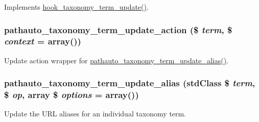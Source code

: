 \label{pathauto_8module_ab861a0bd8ac0d1116d50dc5e446e510b}
Implements \hyperlink{group__hooks_ga5c2477516245f0b9d6b04b8a8d227592}{hook\_\-taxonomy\_\-term\_\-update()}. \hypertarget{pathauto_8module_a5d96ab0723a69f47adf684f49244a47b}{
\subsubsection[{pathauto\_\-taxonomy\_\-term\_\-update\_\-action}]{\setlength{\rightskip}{0pt plus 5cm}pathauto\_\-taxonomy\_\-term\_\-update\_\-action (\$ {\em term}, \/  \$ {\em context} = {\ttfamily array()})}}
\label{pathauto_8module_a5d96ab0723a69f47adf684f49244a47b}
Update action wrapper for \hyperlink{pathauto_8module_a80bfb73e9db12fd22e6cd9908a9bca26}{pathauto\_\-taxonomy\_\-term\_\-update\_\-alias()}. \hypertarget{pathauto_8module_a80bfb73e9db12fd22e6cd9908a9bca26}{
\subsubsection[{pathauto\_\-taxonomy\_\-term\_\-update\_\-alias}]{\setlength{\rightskip}{0pt plus 5cm}pathauto\_\-taxonomy\_\-term\_\-update\_\-alias (stdClass \$ {\em term}, \/  \$ {\em op}, \/  array \$ {\em options} = {\ttfamily array()})}}
\label{pathauto_8module_a80bfb73e9db12fd22e6cd9908a9bca26}
Update the URL aliases for an individual taxonomy term.


